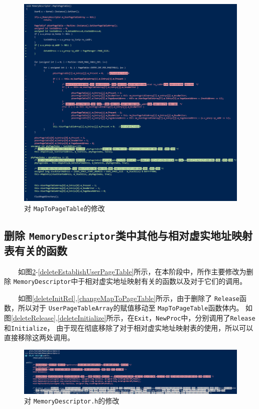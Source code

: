 \begin{figure}[!htbp]
    \centering
    \includegraphics[width=\textwidth]{images/MapToPageTable.png}
    \caption{对 \texttt{MapToPageTable}的修改}\label{MapToPageTable}
\end{figure}



\clearpage
\subsection{删除 \texttt{MemoryDescriptor}类中其他与相对虚实地址映射表有关的函数}

　　如图\ref{h}-\ref{deleteEstablishUserPageTable}所示，在本阶段中，所作主要修改为删除 \texttt{MemoryDescriptor}中于相对虚实地址映射有关的函数以及对于它们的调用。

　　如图\ref{deleteInitRel},\ref{changeMapToPageTable}所示，由于删除了 \texttt{Release}函数，所以对于 \texttt{UserPageTableArray}的赋值移动至 \texttt{MapToPageTable}函数体内。
如图\ref{deleteRelease},\ref{deleteInitialize}所示，在\texttt{Exit}，\texttt{NewProc}中，分别调用了\texttt{Release}和\texttt{Initialize}，
由于现在彻底移除了对于相对虚实地址映射表的使用，所以可以直接移除这两处调用。


\begin{figure}[!htbp]
    \centering
    \includegraphics[width=\textwidth]{images/h.png}
    \caption{对 \texttt{MemoryDescriptor.h}的修改}\label{h}
\end{figure}

